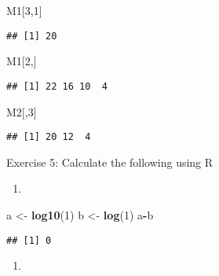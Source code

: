 \documentclass[
]{article}
\newenvironment{Shaded}{\begin{snugshade}}{\end{snugshade}}
\newcommand{\DecValTok}[1]{\textcolor[rgb]{0.00,0.00,0.81}{#1}}
\newcommand{\FunctionTok}[1]{\textcolor[rgb]{0.13,0.29,0.53}{\textbf{#1}}}
\newcommand{\NormalTok}[1]{#1}
\newcommand{\OtherTok}[1]{\textcolor[rgb]{0.56,0.35,0.01}{#1}}
\newcommand{\SpecialCharTok}[1]{\textcolor[rgb]{0.81,0.36,0.00}{\textbf{#1}}}
\providecommand{\tightlist}{%
  \setlength{\itemsep}{0pt}\setlength{\parskip}{0pt}}
\begin{document}
\begin{Shaded}
\begin{Highlighting}[]
\NormalTok{M1[}\DecValTok{3}\NormalTok{,}\DecValTok{1}\NormalTok{]}
\end{Highlighting}
\end{Shaded}

\begin{verbatim}
## [1] 20
\end{verbatim}

\begin{Shaded}
\begin{Highlighting}[]
\NormalTok{M1[}\DecValTok{2}\NormalTok{,]}
\end{Highlighting}
\end{Shaded}

\begin{verbatim}
## [1] 22 16 10  4
\end{verbatim}

\begin{Shaded}
\begin{Highlighting}[]
\NormalTok{M2[,}\DecValTok{3}\NormalTok{]}
\end{Highlighting}
\end{Shaded}

\begin{verbatim}
## [1] 20 12  4
\end{verbatim}

Exercise 5: Calculate the following using R

\begin{enumerate}
\def\labelenumi{\arabic{enumi})}
\tightlist
\item
\end{enumerate}

\begin{Shaded}
\begin{Highlighting}[]
\NormalTok{a }\OtherTok{\textless{}{-}} \FunctionTok{log10}\NormalTok{(}\DecValTok{1}\NormalTok{)}
\NormalTok{b }\OtherTok{\textless{}{-}} \FunctionTok{log}\NormalTok{(}\DecValTok{1}\NormalTok{)}
\NormalTok{a}\SpecialCharTok{{-}}\NormalTok{b}
\end{Highlighting}
\end{Shaded}

\begin{verbatim}
## [1] 0
\end{verbatim}

\begin{enumerate}
\def\labelenumi{\arabic{enumi})}
\setcounter{enumi}{1}
\tightlist
\item
\end{enumerate}
\end{document}
